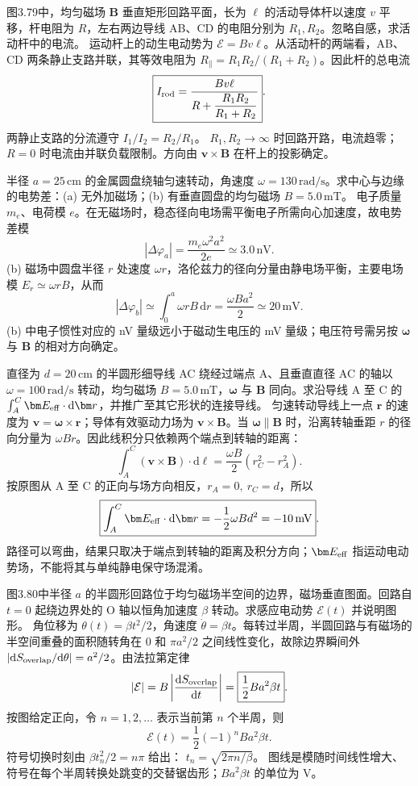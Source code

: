 图3.79中，均匀磁场 $\bm B$ 垂直矩形回路平面，长为 $\ell$ 的活动导体杆以速度 $v$ 平移，杆电阻为 $R$，左右两边导线 AB、CD 的电阻分别为 $R_1,R_2$。忽略自感，求活动杆中的电流。
\exsolution
运动杆上的动生电动势为 $\mathcal E=Bv\ell$。从活动杆的两端看，AB、CD 两条静止支路并联，其等效电阻为 $R_\parallel=R_1R_2/(R_1+R_2)$。因此杆的总电流
\[
\boxed{I_{\rm rod}=\frac{Bv\ell}{R+\dfrac{R_1R_2}{R_1+R_2}}}.
\]
两静止支路的分流遵守 $I_1/I_2=R_2/R_1$。
\excheck $R_1,R_2\to\infty$ 时回路开路，电流趋零；$R=0$ 时电流由并联负载限制。方向由 $\bm v\times\bm B$ 在杆上的投影确定。

半径 $a=25\,\mathrm{cm}$ 的金属圆盘绕轴匀速转动，角速度 $\omega=130\,\mathrm{rad/s}$。求中心与边缘的电势差：(a) 无外加磁场；(b) 有垂直圆盘的均匀磁场 $B=5.0\,\mathrm{mT}$。
\exsolution
电子质量 $m_e$、电荷模 $e$。在无磁场时，稳态径向电场需平衡电子所需向心加速度，故电势差模
\[
\boxed{|\Delta\varphi_a|=\frac{m_e\omega^2a^2}{2e}
\simeq3.0\,\mathrm{nV}}.
\]
(b) 磁场中圆盘半径 $r$ 处速度 $\omega r$，洛伦兹力的径向分量由静电场平衡，主要电场模 $E_r\simeq\omega rB$，从而
\[
\boxed{|\Delta\varphi_b|\simeq
\int_0^a\omega rB\,\mathrm dr
=\frac{\omega Ba^2}{2}\simeq20\,\mathrm{mV}}.
\]
\excheck (b) 中电子惯性对应的 nV 量级远小于磁动生电压的 mV 量级；电压符号需另按 $\bm\omega$ 与 $\bm B$ 的相对方向确定。

直径为 $d=20\,\mathrm{cm}$ 的半圆形细导线 AC 绕经过端点 A、且垂直直径 AC 的轴以 $\omega=100\,\mathrm{rad/s}$ 转动，均匀磁场 $B=5.0\,\mathrm{mT}$，$\bm\omega$ 与 $\bm B$ 同向。求沿导线 A 至 C 的 $\int_A^C\bm E_{\rm eff}\cdot\mathrm d\bm r$，并推广至其它形状的连接导线。
\exsolution
匀速转动导线上一点 $\bm r$ 的速度为 $\bm v=\bm\omega\times\bm r$；导体有效驱动力场为 $\bm v\times\bm B$。当 $\bm\omega\parallel\bm B$ 时，沿离转轴垂距 $r$ 的径向分量为 $\omega Br$。因此线积分只依赖两个端点到转轴的距离：
\[
\int_A^C(\bm v\times\bm B)\cdot\mathrm d\bm\ell
=\frac{\omega B}{2}(r_C^2-r_A^2).
\]
按原图从 A 至 C 的正向与场方向相反，$r_A=0,\ r_C=d$，所以
\[
\boxed{\int_A^C\bm E_{\rm eff}\cdot\mathrm d\bm r
=-\frac12\omega Bd^2=-10\,\mathrm{mV}}.
\]
\excheck 路径可以弯曲，结果只取决于端点到转轴的距离及积分方向；$\bm E_{\rm eff}$ 指运动电动势场，不能将其与单纯静电保守场混淆。

图3.80中半径 $a$ 的半圆形回路位于均匀磁场半空间的边界，磁场垂直图面。回路自 $t=0$ 起绕边界处的 O 轴以恒角加速度 $\beta$ 转动。求感应电动势 $\mathcal E(t)$ 并说明图形。
\exsolution
角位移为 $\theta(t)=\beta t^2/2$，角速度 $\dot\theta=\beta t$。每转过半周，半圆回路与有磁场的半空间重叠的面积随转角在 $0$ 和 $\pi a^2/2$ 之间线性变化，故除边界瞬间外
$|\mathrm dS_{\rm overlap}/\mathrm d\theta|=a^2/2$。由法拉第定律
\[
|\mathcal E|=B\left|\frac{\mathrm dS_{\rm overlap}}{\mathrm dt}\right|
=\boxed{\frac12Ba^2\beta t}.
\]
按图给定正向，令 $n=1,2,\ldots$ 表示当前第 $n$ 个半周，则
\[
\boxed{\mathcal E(t)=\frac12(-1)^n Ba^2\beta t}.
\]
符号切换时刻由 $\beta t_n^2/2=n\pi$ 给出：
$\boxed{t_n=\sqrt{2\pi n/\beta}}$。
\excheck 图线是模随时间线性增大、符号在每个半周转换处跳变的交替锯齿形；$Ba^2\beta t$ 的单位为 V。

